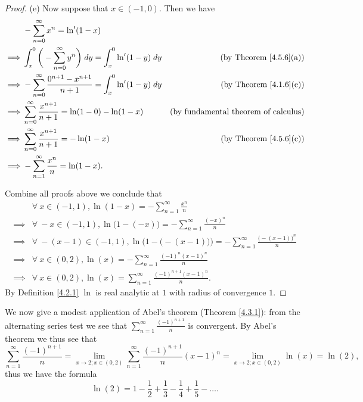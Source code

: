\begin{proof}{(e)}
    Now suppose that \(x \in (-1, 0)\).
    Then we have
    \begin{align*}
                 & - \sum_{n = 0}^\infty x^n = \ln'(1 - x)                                                                                              \\
        \implies & \int_x^0 \bigg(- \sum_{n = 0}^\infty y^n\bigg) \; dy = \int_x^0 \ln'(1 - y) \; dy      & \text{(by Theorem \ref{4.5.6}(a))}          \\
        \implies & - \sum_{n = 0}^\infty \frac{0^{n + 1} - x^{n + 1}}{n + 1} = \int_x^0 \ln'(1 - y) \; dy & \text{(by Theorem \ref{4.1.6}(e))}          \\
        \implies & \sum_{n = 0}^\infty \frac{x^{n + 1}}{n + 1} = \ln(1 - 0) - \ln(1 - x)                  & \text{(by fundamental theorem of calculus)} \\
        \implies & \sum_{n = 0}^\infty \frac{x^{n + 1}}{n + 1} = -\ln(1 - x)                              & \text{(by Theorem \ref{4.5.6}(c))}          \\
        \implies & - \sum_{n = 1}^\infty \frac{x^n}{n} = \ln(1 - x).
    \end{align*}

    Combine all proofs above we conclude that
    \begin{align*}
                 & \forall\ x \in (-1, 1), \ln(1 - x) = - \sum_{n = 1}^\infty \frac{x^n}{n}                                                  \\
        \implies & \forall\ -x \in (-1, 1), \ln\big(1 - (-x)\big) = - \sum_{n = 1}^\infty \frac{(-x)^n}{n}                                   \\
        \implies & \forall\ -(x - 1) \in (-1, 1), \ln\Big(1 - \big(-(x - 1)\big)\Big) = - \sum_{n = 1}^\infty \frac{\big(-(x - 1)\big)^n}{n} \\
        \implies & \forall\ x \in (0, 2), \ln(x) = - \sum_{n = 1}^\infty \frac{(-1)^n (x - 1)^n}{n}                                          \\
        \implies & \forall\ x \in (0, 2), \ln(x) = \sum_{n = 1}^\infty \frac{(-1)^{n + 1} (x - 1)^n}{n}.
    \end{align*}
    By Definition \ref{4.2.1} \(\ln\) is real analytic at \(1\) with radius of convergence \(1\).
\end{proof}

\begin{example}\label{4.5.7}
    We now give a modest application of Abel's theorem (Theorem \ref{4.3.1}):
    from the alternating series test we see that \(\sum_{n = 1}^\infty \frac{(-1)^{n + 1}}{n}\) is convergent.
    By Abel's theorem we thus see that
    \[
        \sum_{n = 1}^\infty \frac{(-1)^{n + 1}}{n} = \lim_{x \to 2 ; x \in (0, 2)} \sum_{n = 1}^\infty \frac{(-1)^{n + 1}}{n} (x - 1)^n = \lim_{x \to 2 ; x \in (0, 2)} \ln(x) = \ln(2),
    \]
    thus we have the formula
    \[
        \ln(2) = 1 - \frac{1}{2} + \frac{1}{3} - \frac{1}{4} +\frac{1}{5} - \dots.
    \]
\end{example}


